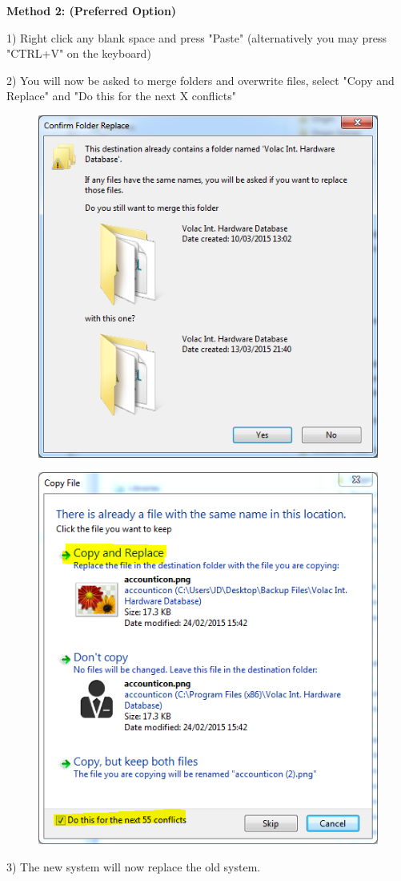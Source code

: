 \textbf{Method 2: (Preferred Option)}

1) Right click any blank space and press "Paste" (alternatively you may press "CTRL+V" on the keyboard)

2) You will now be asked to merge folders and overwrite files, select "Copy and Replace" and "Do this for the next X conflicts"

\begin{figure}[H]
    \includegraphics[width=\textwidth]{./Manual/Images/restore3.png}
\end{figure}

\begin{figure}[H]
    \includegraphics[width=\textwidth]{./Manual/Images/restore4.png}
\end{figure}

3) The new system will now replace the old system. 

\stopcontents[chapters]